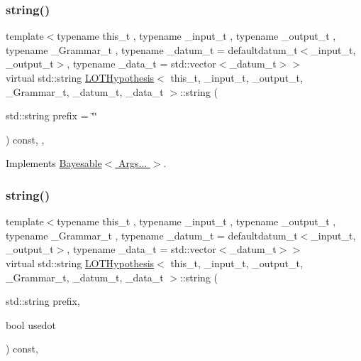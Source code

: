 \mbox{\label{class_l_o_t_hypothesis_a0d4f526264b781130674863164707927}} 
\subsubsection{\texorpdfstring{string()}{string()}\hspace{0.1cm}{\footnotesize\ttfamily [1/2]}}
{\footnotesize\ttfamily template$<$typename this\+\_\+t , typename \+\_\+input\+\_\+t , typename \+\_\+output\+\_\+t , typename \+\_\+\+Grammar\+\_\+t , typename \+\_\+datum\+\_\+t  = defaultdatum\+\_\+t$<$\+\_\+input\+\_\+t, \+\_\+output\+\_\+t$>$, typename \+\_\+data\+\_\+t  = std\+::vector$<$\+\_\+datum\+\_\+t$>$$>$ \\
virtual std\+::string \hyperlink{class_l_o_t_hypothesis}{L\+O\+T\+Hypothesis}$<$ this\+\_\+t, \+\_\+input\+\_\+t, \+\_\+output\+\_\+t, \+\_\+\+Grammar\+\_\+t, \+\_\+datum\+\_\+t, \+\_\+data\+\_\+t $>$\+::string (\begin{DoxyParamCaption}\item[{std\+::string}]{prefix = {\ttfamily \char`\"{}\char`\"{}} }\end{DoxyParamCaption}) const\hspace{0.3cm}{\ttfamily [inline]}, {\ttfamily [override]}, {\ttfamily [virtual]}}



Implements \hyperlink{class_bayesable_ab6944b4bfe5620c96048287a51d019c1}{Bayesable$<$ Args... $>$}.

\mbox{\label{class_l_o_t_hypothesis_ac3ed1c6b744dd7e1a33b5b64f94ba509}} 
\subsubsection{\texorpdfstring{string()}{string()}\hspace{0.1cm}{\footnotesize\ttfamily [2/2]}}
{\footnotesize\ttfamily template$<$typename this\+\_\+t , typename \+\_\+input\+\_\+t , typename \+\_\+output\+\_\+t , typename \+\_\+\+Grammar\+\_\+t , typename \+\_\+datum\+\_\+t  = defaultdatum\+\_\+t$<$\+\_\+input\+\_\+t, \+\_\+output\+\_\+t$>$, typename \+\_\+data\+\_\+t  = std\+::vector$<$\+\_\+datum\+\_\+t$>$$>$ \\
virtual std\+::string \hyperlink{class_l_o_t_hypothesis}{L\+O\+T\+Hypothesis}$<$ this\+\_\+t, \+\_\+input\+\_\+t, \+\_\+output\+\_\+t, \+\_\+\+Grammar\+\_\+t, \+\_\+datum\+\_\+t, \+\_\+data\+\_\+t $>$\+::string (\begin{DoxyParamCaption}\item[{std\+::string}]{prefix,  }\item[{bool}]{usedot }\end{DoxyParamCaption}) const\hspace{0.3cm}{\ttfamily [inline]}, {\ttfamily [virtual]}}



